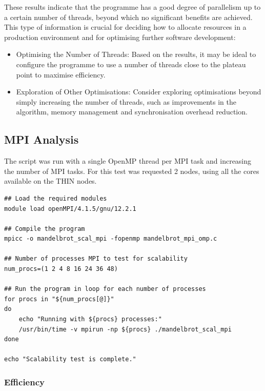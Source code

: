 \documentclass[
]{article}
\providecommand{\tightlist}{%
  \setlength{\itemsep}{0pt}\setlength{\parskip}{0pt}}
\begin{document}
These results indicate that the programme has a good degree of
parallelism up to a certain number of threads, beyond which no
significant benefits are achieved. This type of information is crucial
for deciding how to allocate resources in a production environment and
for optimising further software development:

\begin{itemize}
\tightlist
\item
  Optimising the Number of Threads: Based on the results, it may be
  ideal to configure the programme to use a number of threads close to
  the plateau point to maximise efficiency.
\item
  Exploration of Other Optimisations: Consider exploring optimisations
  beyond simply increasing the number of threads, such as improvements
  in the algorithm, memory management and synchronisation overhead
  reduction.
\end{itemize}

\subsection{MPI Analysis}\label{mpi-analysis}

The script was run with a single OpenMP thread per MPI task and
increasing the number of MPI tasks. For this test was requested 2 nodes,
using all the cores available on the THIN nodes.

\begin{verbatim}
## Load the required modules
module load openMPI/4.1.5/gnu/12.2.1

## Compile the program
mpicc -o mandelbrot_scal_mpi -fopenmp mandelbrot_mpi_omp.c

## Number of processes MPI to test for scalability
num_procs=(1 2 4 8 16 24 36 48)

## Run the program in loop for each number of processes
for procs in "${num_procs[@]}"
do
    echo "Running with ${procs} processes:"
    /usr/bin/time -v mpirun -np ${procs} ./mandelbrot_scal_mpi
done

echo "Scalability test is complete."
\end{verbatim}

\subsubsection{Efficiency}\label{efficiency-1}
\end{document}
